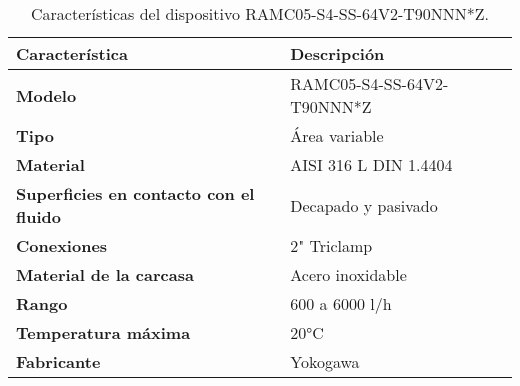 \begin{table}[H]
    \centering
    \caption{Características del dispositivo RAMC05-S4-SS-64V2-T90NNN*Z.}
    \label{table:dispositivoRAMC05}
    \begin{tabular}{| L{5cm} | L{5cm} |}
        \hline
        \textbf{Característica} & \textbf{Descripción}  \\
        \hline
        \textbf{Modelo} & RAMC05-S4-SS-64V2-T90NNN*Z  \\
        \hline
        \textbf{Tipo} & Área variable  \\
        \hline
        \textbf{Material} & AISI 316 L DIN 1.4404  \\
        \hline
        \textbf{Superficies en contacto con el fluido} & Decapado y pasivado  \\
        \hline
        \textbf{Conexiones} & 2" Triclamp  \\
        \hline
        \textbf{Material de la carcasa} & Acero inoxidable  \\
        \hline
        \textbf{Rango} & 600 a 6000 l/h  \\
        \hline
        \textbf{Temperatura máxima} & 20°C  \\
        \hline
        \textbf{Fabricante} & Yokogawa  \\
        \hline
    \end{tabular}
\end{table}
